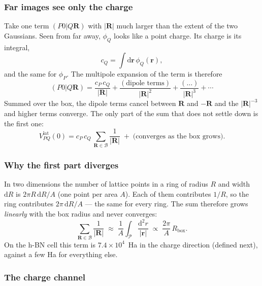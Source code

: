 \documentclass[%
 reprint,
superscriptaddress,
 amsmath,amssymb,
 aps,
prb,
]{revtex4-2}
\newcommand{\br}{\mathbf{r}}
\newcommand{\bR}{\mathbf{R}}
\newcommand{\dd}{\mathrm{d}}
\newcommand{\lat}{\mathrm{lat}}
\begin{document}
\subsubsection{Far images see only the charge}

Take one term $(P0|Q\bR)$ with $|\bR|$ much larger than the extent of the two Gaussians.
Seen from far away, $\phi_Q$ looks like a point charge. Its charge is its integral,
\begin{equation}
  c_Q = \int\dd\br\,\phi_Q(\br),
  \label{eq:charge}
\end{equation}
and the same for $\phi_P$. The multipole expansion of the term is therefore
\begin{equation}
  (P0|Q\bR) = \frac{c_P\,c_Q}{|\bR|} + \frac{(\text{dipole terms})}{|\bR|^2} + \frac{(\ldots)}{|\bR|^3} + \cdots
  \label{eq:multipole}
\end{equation}
Summed over the box, the dipole terms cancel between $\bR$ and $-\bR$ and the $|\bR|^{-3}$ and
higher terms converge. The only part of the sum that does not settle down is the first one:
\begin{equation}
  V^\lat_{PQ}(0) = c_P\,c_Q\,\sum_{\bR\in\mathcal B}\frac{1}{|\bR|}
  \;+\;\big(\text{converges as the box grows}\big).
  \label{eq:split}
\end{equation}

\subsubsection{Why the first part diverges}

In two dimensions the number of lattice points in a ring of radius $R$ and width $\dd R$ is
$2\pi R\,\dd R/A$ (one point per area $A$). Each of them contributes $1/R$, so the ring
contributes $2\pi\,\dd R/A$ --- the same for every ring. The sum therefore grows
\emph{linearly} with the box radius and never converges:
\begin{equation}
  \sum_{\bR\in\mathcal B}\frac{1}{|\bR|}\;\approx\;\frac{1}{A}\int_{\mathcal P}\frac{\dd^2 r}{|\br|}
  \;\propto\;\frac{2\pi}{A}\,R_\mathrm{box}.
\end{equation}
On the h-BN cell this term is $7.4\times10^{4}$~Ha in the charge direction (defined next),
against a few Ha for everything else.

\subsubsection{The charge channel}
\end{document}
